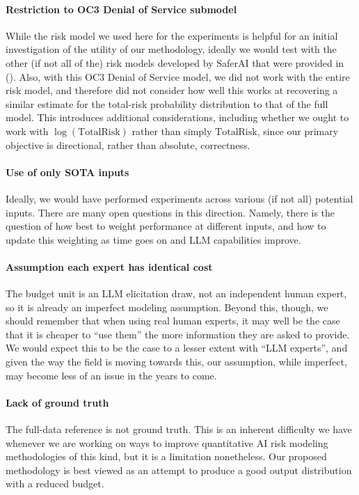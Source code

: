 \documentclass[11pt]{article}
\begin{document}
\paragraph{Restriction to OC3 Denial of Service submodel} While the risk model we used here for the experiments is helpful for an initial investigation of the utility of our methodology, ideally we would test with the other (if not all of the) risk models developed by SaferAI that were provided in (\cite{barrett2025toward}). Also, with this OC3 Denial of Service model, we did not work with the entire risk model, and therefore did not consider how well this works at recovering a similar estimate for the total-risk probability distribution to that of the full model. This introduces additional considerations, including whether we ought to work with $\log(\text{TotalRisk})$ rather than simply $\text{TotalRisk}$, since our primary objective is directional, rather than absolute, correctness.

\paragraph{Use of only SOTA inputs} Ideally, we would have performed experiments across various (if not all) potential inputs. There are many open questions in this direction. Namely, there is the question of how best to weight performance at different inputs, and how to update this weighting as time goes on and LLM capabilities improve.

\paragraph{Assumption each expert has identical cost} The budget unit is an LLM elicitation draw, not an independent human expert, so it is already an imperfect modeling assumption. Beyond this, though, we should remember that when using real human experts, it may well be the case that it is cheaper to ``use them'' the more information they are asked to provide. We would expect this to be the case to a lesser extent with ``LLM experts'', and given the way the field is moving towards this, our assumption, while imperfect, may become less of an issue in the years to come.

\paragraph{Lack of ground truth} The full-data reference is not ground truth. This is an inherent difficulty we have whenever we are working on ways to improve quantitative AI risk modeling methodologies of this kind, but it is a limitation nonetheless. Our proposed methodology is best viewed as an attempt to produce a good output distribution with a reduced budget.
\end{document}

